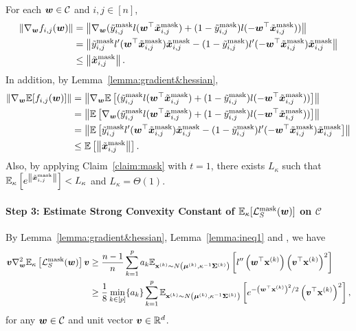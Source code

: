 For each ${\bm{w}} \in \mathcal{C}$ and $i,j \in [n]$, 
\begin{align*}
\lVert \nabla_{\bm{w}} f_{i,j}({\bm{w}}) \rVert 
&= \left \lVert \nabla_{\bm{w}} (\tilde{y}_{i,j}^\mathrm{mask}l({\bm{w}}^\top \tilde{{\bm{x}}}_{i,j}^\mathrm{mask}) + (1-\tilde{y}_{i,j}^\mathrm{mask}) l(-{\bm{w}}^\top \tilde{{\bm{x}}}_{i,j}^\mathrm{mask})) \right \rVert \\
&= \left \lVert \tilde{y}_{i,j}^\mathrm{mask}l'({\bm{w}}^\top \tilde{{\bm{x}}}_{i,j}^\mathrm{mask})\tilde{{\bm{x}}}_{i,j}^\mathrm{mask} - (1-\tilde{y}_{i,j}^\mathrm{mask}) l'(-{\bm{w}}^\top \tilde{{\bm{x}}}_{i,j}^\mathrm{mask})\tilde{{\bm{x}}}_{i,j}^\mathrm{mask} \right \rVert\\
&\leq  \left \lVert \tilde{{\bm{x}}}_{i,j}^\mathrm{mask} \right \rVert.
\end{align*}
In addition, by Lemma~\ref{lemma:gradient&hessian},
\begin{align*}
\lVert \nabla_{\bm{w}} \mathbb{E}[f_{i,j}({\bm{w}})] \rVert 
&= \left \lVert \nabla_{\bm{w}} \mathbb{E}\left[(\tilde{y}_{i,j}^\mathrm{mask}l({\bm{w}}^\top \tilde{{\bm{x}}}_{i,j}^\mathrm{mask}) + (1-\tilde{y}_{i,j}^\mathrm{mask}) l(-{\bm{w}}^\top \tilde{{\bm{x}}}_{i,j}^\mathrm{mask}))\right] \right \rVert \\
&= \left \lVert \mathbb{E}\left[\nabla_{\bm{w}}(\tilde{y}_{i,j}^\mathrm{mask}l({\bm{w}}^\top \tilde{{\bm{x}}}_{i,j}^\mathrm{mask}) + (1-\tilde{y}_{i,j}^\mathrm{mask}) l(-{\bm{w}}^\top \tilde{{\bm{x}}}_{i,j}^\mathrm{mask})) \right] \right \rVert \\
&= \left \lVert \mathbb{E}\left[ \tilde{y}_{i,j}^\mathrm{mask}l'({\bm{w}}^\top \tilde{{\bm{x}}}_{i,j}^\mathrm{mask})\tilde{{\bm{x}}}_{i,j}^\mathrm{mask} - (1-\tilde{y}_{i,j}^\mathrm{mask}) l'(-{\bm{w}}^\top \tilde{{\bm{x}}}_{i,j}^\mathrm{mask})\tilde{{\bm{x}}}_{i,j}^\mathrm{mask} \right]\right \rVert\\
&\leq  \mathbb{E}\left[ \left  \lVert \tilde{{\bm{x}}}_{i,j}^\mathrm{mask} \right \rVert \right].
\end{align*}
Also, by applying Claim~\ref{claim:mask} with $t=1$, there exists $L_\kappa$ such that $\mathbb{E}_\kappa \left[e^{ \left  \lVert \tilde{{\bm{x}}}_{i,j}^\mathrm{mask} \right \rVert} \right]<L_\kappa$ and $L_\kappa = \Theta(1)$.

\paragraph{Step 3: Estimate Strong Convexity Constant of $\mathbb{E}_\kappa[\mathcal{L}_S^\mathrm{mask} ({\bm{w}})]$ on $\mathcal{C}$} \mbox{}

By Lemma~\ref{lemma:gradient&hessian}, Lemma~\ref{lemma:ineq1} and ,  we have 
\begin{align*}
    {\bm{v}} \nabla^2_{\bm{w}} \mathbb{E}_\kappa\left[\mathcal{L}_S^\mathrm{mask} ({\bm{w}})\right] {\bm{v}} &\geq \frac{n-1}{n} \sum_{k=1}^p a_k \mathbb{E}_{{\mathbf{x}}^{(k)} \sim N\left ({\bm{\mu}}^{(k)}, \kappa^{-1} {\bm{\Sigma}}^{(k)}\right)}\left[l''\left({\bm{w}}^\top {\mathbf{x}}^{(k)}\right) \left({\bm{v}}^\top {\mathbf{x}}^{(k)}\right)^2 \right]\\
    &\geq \frac{1}{8} \min_{k\in [p]}\{a_k\} \sum_{k=1}^p \mathbb{E}_{{\mathbf{x}}^{(k)} \sim N\left ({\bm{\mu}}^{(k)}, \kappa^{-1}{\bm{\Sigma}}^{(k)}\right)}\left[e^{-\left({\bm{w}}^\top {\mathbf{x}}^{(k)}\right)^2/2} \left({\bm{v}}^\top {\mathbf{x}}^{(k)}\right)^2 \right],
\end{align*}
for any ${\bm{w}}\in \mathcal{C}$ and unit vector ${\bm{v}} \in \mathbb{R}^d$.

